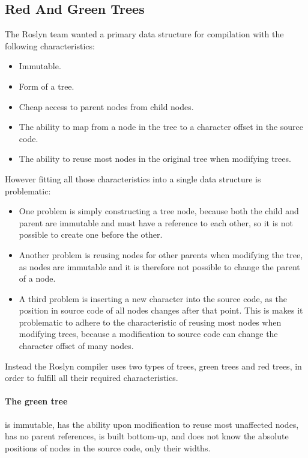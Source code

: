 \subsection{Red And Green Trees}
\label{subsec:roslyn_red_green_trees}
The Roslyn team wanted a primary data structure for compilation with the following characteristics\cite{lippert2012redgreen}:
\begin{itemize}
	\item Immutable.
	\item Form of a tree.
	\item Cheap access to parent nodes from child nodes.
	\item The ability to map from a node in the tree to a character offset in the source code.
	\item The ability to reuse most nodes in the original tree when modifying trees.
\end{itemize}
However fitting all those characteristics into a single data structure is problematic\cite{lippert2012redgreen}:
\begin{itemize}
\item One problem is simply constructing a tree node, because both the child and parent are immutable and must have a reference to each other, so it is not possible to create one before the other.
\item Another problem is reusing nodes for other parents when modifying the tree, as nodes are immutable and it is therefore not possible to change the parent of a node.
\item A third problem is inserting a new character into the source code, as the position in source code of all nodes changes after that point. This is makes it problematic to adhere to the characteristic of reusing most nodes when modifying trees, because a modification to source code can change the character offset of many nodes.
\end{itemize}

Instead the Roslyn compiler uses two types of trees, green trees and red trees, in order to fulfill all their required characteristics.

\paragraph{The green tree} is immutable, has the ability upon modification to reuse most unaffected nodes, has no parent references, is built bottom-up, and does not know the absolute positions of nodes in the source code, only their widths\cite{lippert2012redgreen}.

